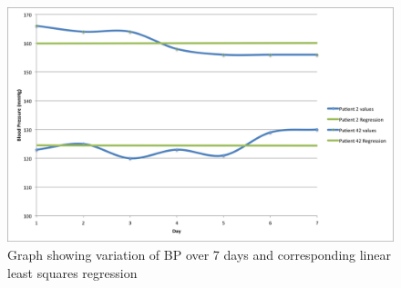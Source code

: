 \documentclass[11pt]{article}
\begin{document}
\begin{figure}
\centering
\includegraphics[scale=0.4]{replinreg.png}
\caption{Graph showing variation of BP over 7 days and corresponding linear least squares regression \label{replinreg}} 
\end{figure} 
\end{document}
